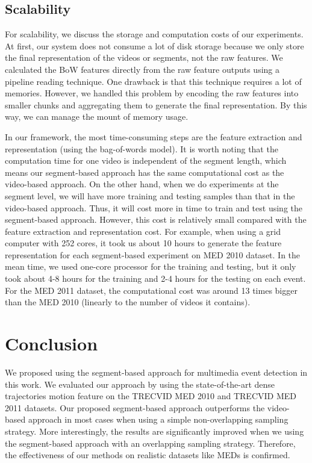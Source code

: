 \subsection{Scalability} For scalability, we discuss the storage and computation costs of our experiments. At first, our system does not consume a lot of disk storage because we only store the final representation of the videos or segments, not the raw features. We calculated the BoW features directly from the raw feature outputs using a pipeline reading technique. One drawback is that this technique requires a lot of memories. However, we handled this problem by encoding the raw features into smaller chunks and aggregating them to generate the final representation. By this way, we can manage the mount of memory usage.

In our framework, the most time-consuming steps are the feature extraction and representation (using the bag-of-words model). It is worth noting that the computation time for one video is independent of the segment length, which means our segment-based approach has the same computational cost as the video-based approach. On the other hand, when we do experiments at the segment level, we will have more training and testing samples than that in the video-based approach. Thus, it will cost more in time to train and test using the segment-based approach. However, this cost is relatively small compared with the feature extraction and representation cost. For example, when using a grid computer with 252 cores, it took us about 10 hours to generate the feature representation for each segment-based experiment on MED 2010 dataset. In the mean time, we used one-core processor for the training and testing, but it only took about 4-8 hours for the training and 2-4 hours for the testing on each event. For the MED 2011 dataset, the computational cost was around 13 times bigger than the MED 2010 (linearly to the number of videos it contains).

\section{Conclusion}
\label{conclusion}
We proposed using the segment-based approach for multimedia event detection in this work. We evaluated our approach by using the state-of-the-art dense trajectories motion feature on the TRECVID MED 2010 and TRECVID MED 2011 datasets. Our proposed segment-based approach outperforms the video-based approach in most cases when using a simple non-overlapping sampling strategy. More interestingly, the results are significantly improved when we using the segment-based approach with an overlapping sampling strategy. Therefore, the effectiveness of our methods on realistic datasets like MEDs is confirmed.


